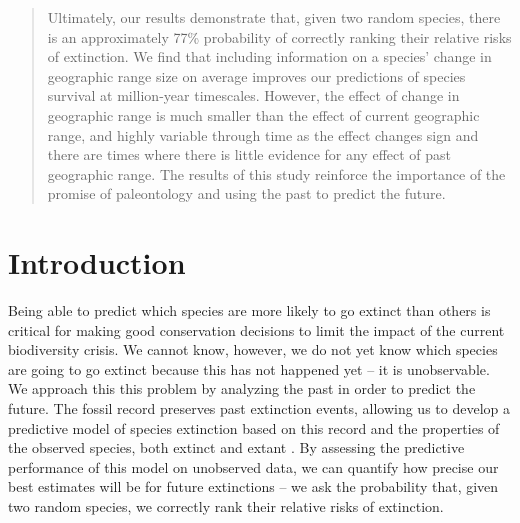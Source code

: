 \documentclass[12pt,letterpaper]{article}
\begin{document}
\begin{abstract}

  Ultimately, our results demonstrate that, given two random species, there is an approximately 77\% probability of correctly ranking their relative risks of extinction. We find that including information on a species' change in geographic range size on average improves our predictions of species survival at million-year timescales. However, the effect of change in geographic range is much smaller than the effect of current geographic range, and highly variable through time as the effect changes sign and there are times where there is little evidence for any effect of past geographic range. The results of this study reinforce the importance of the promise of paleontology and using the past to predict the future.
\end{abstract}


\section{Introduction}

Being able to predict which species are more likely to go extinct than others is critical for making good conservation decisions to limit the impact of the current biodiversity crisis. We cannot know, however, we do not yet know which species are going to go extinct because this has not happened yet -- it is unobservable. We approach this this problem by analyzing the past in order to predict the future. The fossil record preserves past extinction events, allowing us to develop a predictive model of species extinction based on this record and the properties of the observed species, both extinct and extant \citep{Harnik2012,Finnegan2015}. By assessing the predictive performance of this model on unobserved data, we can quantify how precise our best estimates will be for future extinctions -- we ask the probability that, given two random species, we correctly rank their relative risks of extinction.
\end{document}
